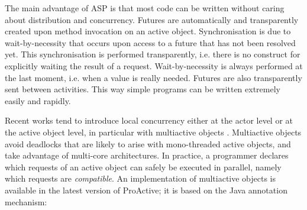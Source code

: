 \smallskip

The main advantage of ASP is that most code can be written without
caring about distribution and concurrency.  Futures are automatically
and transparently created upon method invocation on an active object.
Synchronisation is due to wait-by-necessity that occurs
upon access to a future that has not been resolved yet.
This synchronisation is performed transparently, i.e. 
there is no  construct for explicitly waiting the result of
a request. Wait-by-necessity is always
performed at the last moment, i.e. when a value is really needed.
Futures are also transparently sent between activities. This
way simple programs can be written extremely easily and rapidly.


Recent works tend to introduce local concurrency either at the actor
level
\cite{Scholliers:2014:PAM:2563745.2564410,ref:spec-actors} or at the
active object level, in particular with multiactive objects
\cite{ref:mao}.
Multiactive objects avoid deadlocks that are likely to arise
with mono-threaded active objects, and take
advantage of multi-core architectures.  
In practice, a programmer declares which requests of an active object can safely be
executed in parallel, namely which requests are \emph{compatible}. An implementation of 
multiactive objects is available in the latest version of ProActive; 
it is based on the Java annotation
mechanism:
